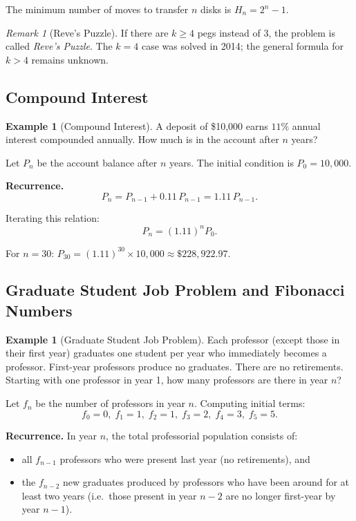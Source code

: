 \documentclass[11pt, a4paper, notitlepage]{report}
\theoremstyle{definition}
\newtheorem{example}[theorem]{Example}
\theoremstyle{remark}
\newtheorem{remark}[theorem]{Remark}
\begin{document}
\begin{keyresult}[title={Tower of Hanoi Solution}]
The minimum number of moves to transfer $n$ disks is $H_n = 2^n - 1$.
\end{keyresult}

\begin{remark}[Reve's Puzzle]
If there are $k \geq 4$ pegs instead of 3, the problem is called \emph{Reve's Puzzle}.  The
$k = 4$ case was solved in 2014; the general formula for $k > 4$ remains unknown.
\end{remark}

\subsection{Compound Interest}
\label{subsec:compound-interest}

\begin{example}[Compound Interest]
A deposit of \$10{,}000 earns $11\%$ annual interest compounded annually.  How much is in the
account after $n$ years?
\end{example}

Let $P_n$ be the account balance after $n$ years.  The initial condition is $P_0 = 10{,}000$.

\textbf{Recurrence.}
\[
  P_n = P_{n-1} + 0.11\,P_{n-1} = 1.11\,P_{n-1}.
\]

Iterating this relation:
\[
  P_n = (1.11)^n P_0.
\]

For $n = 30$: $P_{30} = (1.11)^{30} \times 10{,}000 \approx \$228{,}922.97$.

\subsection{Graduate Student Job Problem and Fibonacci Numbers}
\label{subsec:fibonacci}

\begin{example}[Graduate Student Job Problem]
Each professor (except those in their first year) graduates one student per year who immediately
becomes a professor.  First-year professors produce no graduates.  There are no retirements.
Starting with one professor in year 1, how many professors are there in year $n$?
\end{example}

Let $f_n$ be the number of professors in year $n$.  Computing initial terms:
\[
  f_0 = 0,\; f_1 = 1,\; f_2 = 1,\; f_3 = 2,\; f_4 = 3,\; f_5 = 5.
\]

\textbf{Recurrence.}  In year $n$, the total professorial population consists of:
\begin{itemize}
  \item all $f_{n-1}$ professors who were present last year (no retirements), and
  \item the $f_{n-2}$ new graduates produced by professors who have been around for at least
        two years (i.e.\ those present in year $n-2$ are no longer first-year by year $n-1$).
\end{itemize}
\end{document}
